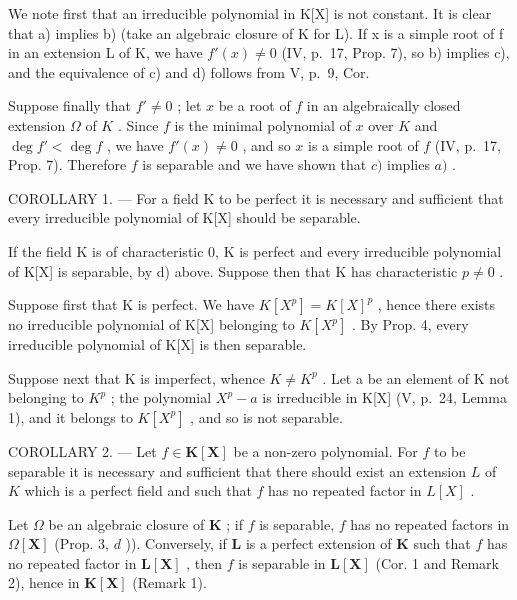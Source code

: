 We note first that an irreducible polynomial in K{[}X{]} is not constant. It is clear that a) implies b) (take an algebraic closure of K for L). If x is a simple root of f in an extension L of K, we have \(f'(x) \neq 0\) (IV, p.~17, Prop. 7), so b) implies c), and the equivalence of c) and d) follows from V, p.~9, Cor.

Suppose finally that \(f' \neq 0\) ; let \(x\) be a root of \(f\) in an algebraically closed extension \(\Omega\) of \(K\) . Since \(f\) is the minimal polynomial of \(x\) over \(K\) and \(\deg f' < \deg f\) , we have \(f'(x) \neq 0\) , and so \(x\) is a simple root of \(f\) (IV, p.~17, Prop. 7). Therefore \(f\) is separable and we have shown that \(c)\) implies \(a)\) .

COROLLARY 1. --- For a field K to be perfect it is necessary and sufficient that every irreducible polynomial of K{[}X{]} should be separable.

If the field K is of characteristic 0, K is perfect and every irreducible polynomial of K{[}X{]} is separable, by d) above. Suppose then that K has characteristic \(p \neq 0\) .

Suppose first that K is perfect. We have \(K[X^{p}] = K[X]^{p}\) , hence there exists no irreducible polynomial of K{[}X{]} belonging to \(K[X^{p}]\) . By Prop. 4, every irreducible polynomial of K{[}X{]} is then separable.

Suppose next that K is imperfect, whence \(K \neq K^{p}\) . Let a be an element of K not belonging to \(K^{p}\) ; the polynomial \(X^{p} - a\) is irreducible in K{[}X{]} (V, p.~24, Lemma 1), and it belongs to \(K[X^{p}]\) , and so is not separable.

COROLLARY 2. --- Let \(f \in \mathbf{K}[\mathbf{X}]\) be a non-zero polynomial. For \(f\) to be separable it is necessary and sufficient that there should exist an extension \(L\) of \(K\) which is a perfect field and such that \(f\) has no repeated factor in \(L[X]\) .

Let \(\Omega\) be an algebraic closure of \(\mathbf{K}\) ; if \(f\) is separable, \(f\) has no repeated factors in \(\Omega[\mathbf{X}]\) (Prop. 3, \(d\) )). Conversely, if \(\mathbf{L}\) is a perfect extension of \(\mathbf{K}\) such that \(f\) has no repeated factor in \(\mathbf{L}[\mathbf{X}]\) , then \(f\) is separable in \(\mathbf{L}[\mathbf{X}]\) (Cor. 1 and Remark 2), hence in \(\mathbf{K}[\mathbf{X}]\) (Remark 1).

